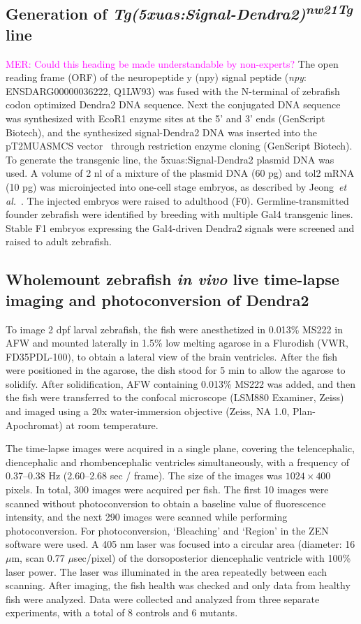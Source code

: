 \documentclass[fleqn]{wlscirep}
\newcommand{\mer}[1]{\textcolor{magenta}{#1}}
\begin{document}
\subsection*{Generation of \emph{Tg(5xuas:Signal-Dendra2)\textsuperscript{nw21Tg}} line}
\mer{MER: Could this heading be made understandable by non-experts?}
The open reading frame (ORF) of the neuropeptide y (npy) signal peptide (\emph{npy}: ENSDARG00000036222, Q1LW93) was fused with the N-terminal of zebrafish codon optimized Dendra2 DNA sequence. Next the conjugated DNA sequence was synthesized with EcoR1 enzyme sites at the 5’ and 3’ ends (GenScript Biotech), and the synthesized signal-Dendra2 DNA was inserted into the pT2MUASMCS vector~\cite{Asakawa2008GeneticZebrafish} through restriction enzyme cloning (GenScript Biotech).  To generate the transgenic line, the 5xuas:Signal-Dendra2 plasmid DNA was used. A volume of 2 nl of a mixture of the plasmid DNA (60 pg) and tol2 mRNA (10 pg) was microinjected into one-cell stage embryos, as described by Jeong~\emph{et al.}~\cite{Jeong2024TheZebrafish}. The injected embryos were raised to adulthood (F0). Germline-transmitted founder zebrafish were identified by breeding with multiple Gal4 transgenic lines. Stable F1 embryos expressing the Gal4-driven Dendra2 signals were screened and raised to adult zebrafish.

\subsection*{Wholemount zebrafish \emph{in vivo} live time-lapse imaging and photoconversion of Dendra2}
To image 2 dpf larval zebrafish, the fish were anesthetized in 0.013\% MS222 in AFW and mounted laterally in 1.5\% low melting agarose in a Flurodish (VWR, FD35PDL-100), to obtain a lateral view of the brain ventricles. After the fish were positioned in the agarose, the dish stood for 5 min to allow the agarose to solidify. After solidification, AFW containing 0.013\% MS222 was added, and then the fish were transferred to the confocal microscope (LSM880 Examiner, Zeiss) and imaged using a 20x water-immersion objective (Zeiss, NA 1.0, Plan-Apochromat) at room temperature.

The time-lapse images were acquired in a single plane, covering the telencephalic, diencephalic and rhombencephalic ventricles simultaneously, with a frequency of 0.37--0.38 Hz (2.60--2.68 sec / frame). The size of the images was $1024\times400$ pixels. In total, 300 images were acquired per fish. The first 10 images were scanned without photoconversion to obtain a baseline value of fluorescence intensity, and the next 290 images were scanned while performing photoconversion. For photoconversion, ‘Bleaching’ and ‘Region’ in the ZEN software were used. A 405 nm laser was focused into a circular area (diameter: 16 $\mu$m, scan 0.77 $\mu$sec/pixel) of the dorsoposterior diencephalic ventricle with 100\% laser power. The laser was illuminated in the area repeatedly between each scanning. After imaging, the fish health was checked and only data from healthy fish were analyzed.
Data were collected and analyzed from three separate experiments, with a total of 8 controls and 6 mutants.
\end{document}
